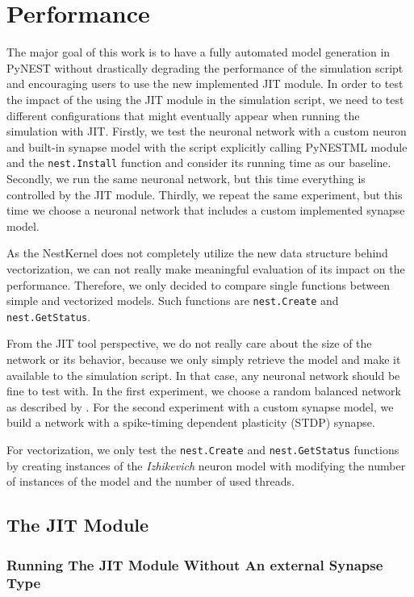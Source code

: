 \chapter{Performance}
 \label{chap:perf}
 
 The major goal of this work is to have a fully automated model generation in PyNEST without drastically degrading the performance of the simulation script and encouraging users to use the new implemented JIT module. In order to test the impact of the using the JIT module in the simulation script, we need to test different configurations that might eventually appear when running the simulation with JIT. Firstly, we test the neuronal network with a custom neuron and built-in synapse model with the script explicitly calling PyNESTML module and the \texttt{nest.Install} function and  consider its running time as our baseline. Secondly, we run the same neuronal network, but this time everything is controlled by the JIT module. Thirdly, we repeat the same experiment, but this time we choose a neuronal network that includes a custom implemented synapse model.
 
 As the NestKernel does not completely utilize the new data structure behind vectorization, we can not really make meaningful evaluation of its impact on the performance. Therefore, we only decided to compare single functions between simple and vectorized models. Such functions are \texttt{nest.Create} and \texttt{nest.GetStatus}.
 
 From the JIT tool perspective, we do not really care about the size of the network or its behavior, because we only simply retrieve the model and make it available to the simulation script. In that case, any neuronal network should be fine to test with. In the first experiment, we choose a random balanced network as  described by \citet{brunel2000dynamics}. For the second experiment with a custom synapse model, we build a network with a spike-timing dependent plasticity (STDP) synapse.
 
 
 For vectorization, we only test the \texttt{nest.Create} and \texttt{nest.GetStatus} functions by creating instances of the \emph{Izhikevich} \citep{1257420} neuron model with modifying the number of instances of the model and the number of used threads.
 
\section{The JIT Module}

\subsection{Running The JIT Module Without An external Synapse Type}

